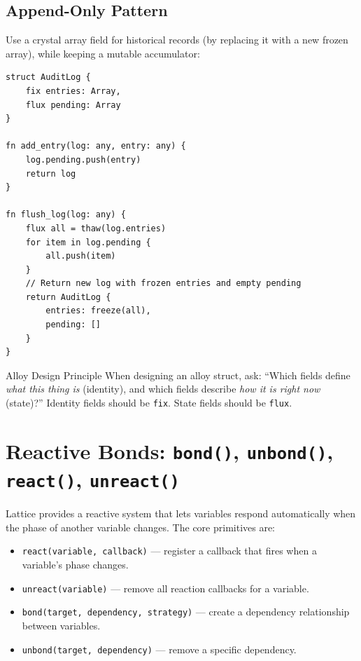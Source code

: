 \subsection{Append-Only Pattern}

Use a crystal array field for historical records (by replacing it with a new frozen array), while keeping a mutable accumulator:

\begin{lstlisting}[language=Lattice, caption={Append-only log pattern}]
struct AuditLog {
    fix entries: Array,
    flux pending: Array
}

fn add_entry(log: any, entry: any) {
    log.pending.push(entry)
    return log
}

fn flush_log(log: any) {
    flux all = thaw(log.entries)
    for item in log.pending {
        all.push(item)
    }
    // Return new log with frozen entries and empty pending
    return AuditLog {
        entries: freeze(all),
        pending: []
    }
}
\end{lstlisting}

\begin{tipbox}{Alloy Design Principle}
When designing an alloy struct, ask: ``Which fields define \emph{what this thing is} (identity), and which fields describe \emph{how it is right now} (state)?''
Identity fields should be \lstinline|fix|.
State fields should be \lstinline|flux|.
\end{tipbox}

\section{Reactive Bonds: \texttt{bond()}, \texttt{unbond()}, \texttt{react()}, \texttt{unreact()}}\label{sec:reactive-bonds}


Lattice provides a reactive system that lets variables respond automatically when the phase of another variable changes.
The core primitives are:

\begin{itemize}
  \item \lstinline|react(variable, callback)| --- register a callback that fires when a variable's phase changes.
  \item \lstinline|unreact(variable)| --- remove all reaction callbacks for a variable.
  \item \lstinline|bond(target, dependency, strategy)| --- create a dependency relationship between variables.
  \item \lstinline|unbond(target, dependency)| --- remove a specific dependency.
\end{itemize}

